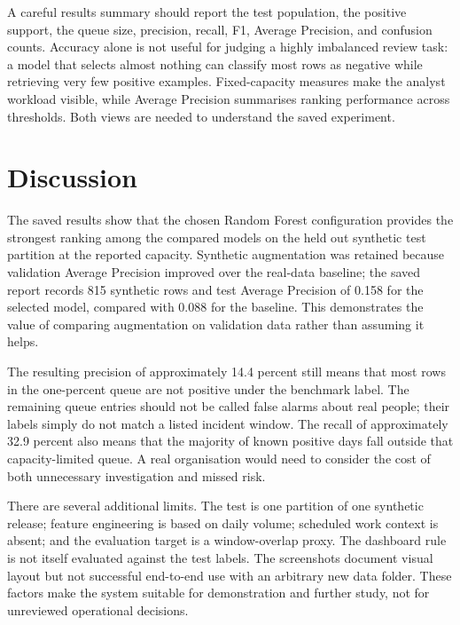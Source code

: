 A careful results summary should report the test population, the
positive support, the queue size, precision, recall, F1, Average
Precision, and confusion counts. Accuracy alone is not useful for
judging a highly imbalanced review task: a model that selects almost
nothing can classify most rows as negative while retrieving very few
positive examples. Fixed-capacity measures make the analyst workload
visible, while Average Precision summarises ranking performance across
thresholds. Both views are needed to understand the saved experiment.

\section{Discussion}
The saved results show that the chosen Random Forest configuration
provides the strongest ranking among the compared models on the held
out synthetic test partition at the reported capacity. Synthetic
augmentation was retained because validation Average Precision
improved over the real-data baseline; the saved report records 815
synthetic rows and test Average Precision of 0.158 for the selected
model, compared with 0.088 for the baseline. This demonstrates the
value of comparing augmentation on validation data rather than
assuming it helps.

The resulting precision of approximately 14.4 percent still means
that most rows in the one-percent queue are not positive under the
benchmark label. The remaining queue entries should not be called
false alarms about real people; their labels simply do not match a
listed incident window. The recall of approximately 32.9 percent also
means that the majority of known positive days fall outside that
capacity-limited queue. A real organisation would need to consider the
cost of both unnecessary investigation and missed risk.

There are several additional limits. The test is one partition of one
synthetic release; feature engineering is based on daily volume;
scheduled work context is absent; and the evaluation target is a
window-overlap proxy. The dashboard rule is not itself evaluated
against the test labels. The screenshots document visual layout but
not successful end-to-end use with an arbitrary new data folder.
These factors make the system suitable for demonstration and further
study, not for unreviewed operational decisions.


